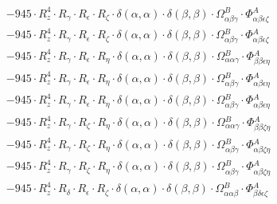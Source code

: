 \documentclass{article}
\begin{document}
\begin{subequations}
\begin{gather}
\begin{array}{c}
 \\[0.2em] 		 - 945 \cdot R_{z}^{4} \cdot R_{\gamma{}} \cdot R_{\epsilon{}} \cdot R_{\zeta{}} \cdot \delta{}\left(\alpha{}, \alpha{}\right) \cdot \delta{}\left(\beta{}, \beta{}\right) \cdot \Omega{}^{B}_{\alpha{}\beta{}\gamma{}} \cdot \Phi{}^{A}_{\alpha{}\beta{}\epsilon{}\zeta{}} 
 \\[0.2em] 		 - 945 \cdot R_{z}^{4} \cdot R_{\gamma{}} \cdot R_{\epsilon{}} \cdot R_{\zeta{}} \cdot \delta{}\left(\alpha{}, \alpha{}\right) \cdot \delta{}\left(\beta{}, \beta{}\right) \cdot \Omega{}^{B}_{\alpha{}\beta{}\gamma{}} \cdot \Phi{}^{A}_{\alpha{}\beta{}\epsilon{}\zeta{}} 
 \\[0.2em] 		 - 945 \cdot R_{z}^{4} \cdot R_{\gamma{}} \cdot R_{\epsilon{}} \cdot R_{\eta{}} \cdot \delta{}\left(\alpha{}, \alpha{}\right) \cdot \delta{}\left(\beta{}, \beta{}\right) \cdot \Omega{}^{B}_{\alpha{}\alpha{}\gamma{}} \cdot \Phi{}^{A}_{\beta{}\beta{}\epsilon{}\eta{}} 
 \\[0.2em] 		 - 945 \cdot R_{z}^{4} \cdot R_{\gamma{}} \cdot R_{\epsilon{}} \cdot R_{\eta{}} \cdot \delta{}\left(\alpha{}, \alpha{}\right) \cdot \delta{}\left(\beta{}, \beta{}\right) \cdot \Omega{}^{B}_{\alpha{}\beta{}\gamma{}} \cdot \Phi{}^{A}_{\alpha{}\beta{}\epsilon{}\eta{}} 
 \\[0.2em] 		 - 945 \cdot R_{z}^{4} \cdot R_{\gamma{}} \cdot R_{\epsilon{}} \cdot R_{\eta{}} \cdot \delta{}\left(\alpha{}, \alpha{}\right) \cdot \delta{}\left(\beta{}, \beta{}\right) \cdot \Omega{}^{B}_{\alpha{}\beta{}\gamma{}} \cdot \Phi{}^{A}_{\alpha{}\beta{}\epsilon{}\eta{}} 
 \\[0.2em] 		 - 945 \cdot R_{z}^{4} \cdot R_{\gamma{}} \cdot R_{\zeta{}} \cdot R_{\eta{}} \cdot \delta{}\left(\alpha{}, \alpha{}\right) \cdot \delta{}\left(\beta{}, \beta{}\right) \cdot \Omega{}^{B}_{\alpha{}\alpha{}\gamma{}} \cdot \Phi{}^{A}_{\beta{}\beta{}\zeta{}\eta{}} 
 \\[0.2em] 		 - 945 \cdot R_{z}^{4} \cdot R_{\gamma{}} \cdot R_{\zeta{}} \cdot R_{\eta{}} \cdot \delta{}\left(\alpha{}, \alpha{}\right) \cdot \delta{}\left(\beta{}, \beta{}\right) \cdot \Omega{}^{B}_{\alpha{}\beta{}\gamma{}} \cdot \Phi{}^{A}_{\alpha{}\beta{}\zeta{}\eta{}} 
 \\[0.2em] 		 - 945 \cdot R_{z}^{4} \cdot R_{\gamma{}} \cdot R_{\zeta{}} \cdot R_{\eta{}} \cdot \delta{}\left(\alpha{}, \alpha{}\right) \cdot \delta{}\left(\beta{}, \beta{}\right) \cdot \Omega{}^{B}_{\alpha{}\beta{}\gamma{}} \cdot \Phi{}^{A}_{\alpha{}\beta{}\zeta{}\eta{}} 
 \\[0.2em] 		 - 945 \cdot R_{z}^{4} \cdot R_{\delta{}} \cdot R_{\epsilon{}} \cdot R_{\zeta{}} \cdot \delta{}\left(\alpha{}, \alpha{}\right) \cdot \delta{}\left(\beta{}, \beta{}\right) \cdot \Omega{}^{B}_{\alpha{}\alpha{}\beta{}} \cdot \Phi{}^{A}_{\beta{}\delta{}\epsilon{}\zeta{}} 

\end{array}
\end{gather}
\end{subequations}
\end{document}
